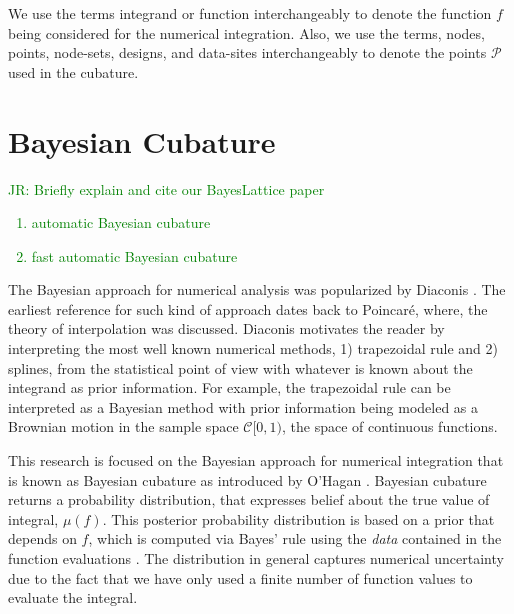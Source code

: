 \documentclass{svjour3}                     %
\newcommand{\JRNote}[1]{{\textcolor{green}{JR: #1}}}
\begin{document}
We use the terms integrand or function interchangeably to denote the function $f$ being considered for the numerical integration. Also, we use the terms, nodes, points, node-sets, designs, and data-sites interchangeably to denote the points $\mathcal{P}$ used in the cubature.






















\section{Bayesian Cubature}
\label{sec:BC} 

\JRNote{
Briefly explain and cite our BayesLattice paper
\begin{enumerate}
	\item automatic Bayesian cubature
	\item fast automatic Bayesian cubature
\end{enumerate}
}



The Bayesian approach for numerical analysis was popularized by Diaconis \cite{Dia88a}. The earliest reference for such kind of approach dates back to Poincar\'e, where, the theory of interpolation was discussed.
Diaconis motivates the reader by interpreting the most well known numerical methods, 1) trapezoidal rule and 2) splines, from the statistical point of view with whatever is known about the integrand as prior information. 
For example, the trapezoidal rule can be interpreted as a Bayesian method with prior information being modeled as a Brownian motion in the sample space $\mathcal{C}[0,1)$, the space of continuous functions. %

This research is focused on the Bayesian approach for numerical integration that is known as Bayesian cubature as introduced by O'Hagan \cite{OHagen1991}.  %
Bayesian cubature returns a probability distribution, that expresses belief about the true value of integral, $\mu(f)$.
This posterior probability distribution is based on a prior that depends on $f$, which is computed via Bayes' rule using the \emph{data} contained in the function evaluations \cite{BriEtal18a}. 
The distribution in general captures numerical uncertainty due to the fact that we have only used a finite number of function values to evaluate the integral.
\end{document}
